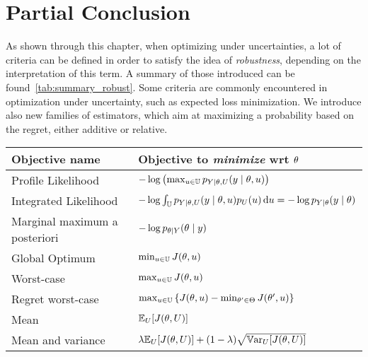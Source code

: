 \documentclass[../../Main_ManuscritThese.tex]{subfiles}
\begin{document}
\section{Partial Conclusion}
\label{sec:ch3_partial_ccl}
As shown through this chapter, when optimizing under uncertainties, a lot of criteria can be defined in order to satisfy the idea of \emph{robustness}, depending on the interpretation of this term. A summary of those introduced can be found~\cref{tab:summary_robust}. Some criteria are commonly encountered in optimization under uncertainty, such as expected loss minimization. We introduce also new families of estimators, which aim at maximizing a probability based on the regret, either additive or relative.
\begin{table}[ht]
  \centering
  \begin{tabular}{ll}
    \toprule
    Objective name                & Objective to \emph{minimize} wrt $\theta$                                                                                 \\ \midrule
    Profile Likelihood            & $-\log \left(\max_{u \in \mathbb{U}} p_{Y \mid \theta, U}(y \mid \theta, u)\right)$                                       \\
    Integrated Likelihood         & $-\log \int_{\mathbb{U}} p_{Y \mid \theta, U}(y \mid \theta, u)p_{U}(u) \,\mathrm{d}u=-\log p_{Y\mid \theta}(y\mid \theta)$ \\
    Marginal maximum a posteriori & $-\log p_{\theta\mid Y}(\theta \mid y)$                                                                                      \\ \midrule
    Global Optimum                & $\min_{u\in\mathbb{U}} J(\theta, u)$                                                                                     \\
    Worst-case                    & $\max_{u \in \mathbb{U}} J(\theta, u)$                                                                                   \\
    Regret worst-case             & $\max_{u\in\mathbb{U}}\left\{J(\theta, u) - \min_{\theta^{\prime}\in\Theta} J(\theta^{\prime}, u)\right\}$                  \\ \midrule
    Mean                          & $\mathbb{E}_{U}[J(\theta, U)]$                                                                                               \\
    Mean and variance             & $ \lambda \mathbb{E}_{U}[J(\theta, U)] + (1-\lambda) \sqrt{\mathbb{V}\mathrm{ar}_{U}[J(\theta, U)]}$                                         \\ \midrule

\end{tabular}
\end{table}
\end{document}
